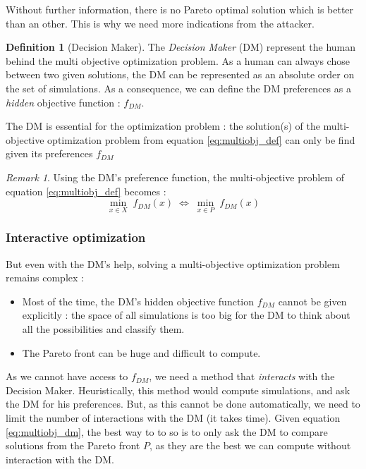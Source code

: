 \documentclass{article}
\theoremstyle{definition}
\newtheorem{definition}{Definition}[section]
\theoremstyle{remark}
\newtheorem{remark}{Remark}
\begin{document}
			Without further information, there is no Pareto optimal solution which is better than an other. This is why we need more indications from the attacker. 

			\begin{definition}[Decision Maker]
				The \emph{Decision Maker} (DM) represent the human behind the multi objective optimization problem. As a human can always chose between two given solutions, the DM can be represented as an absolute order on the set of simulations.
				As a consequence, we can define the DM preferences as a \emph{hidden} objective function : $f_{DM}$.
			\end{definition}

			The DM is essential for the optimization problem : the solution(s) of the multi-objective optimization problem from equation \ref{eq:multiobj_def} can only be find given its preferences $f_{DM}$

			\begin{remark}
				Using the DM's preference function, the multi-objective problem of equation \ref{eq:multiobj_def} becomes :
				\begin{equation}\label{eq:multiobj_dm}
						\min_{x\in X}  \; f_{DM}(x) \; \Longleftrightarrow \;\min_{x\in P} \;f_{DM}(x)
				\end{equation}
			\end{remark}
			
		\subsubsection{Interactive optimization}
			But even with the DM's help, solving a multi-objective optimization problem remains complex : 
			\begin{itemize}
			\item Most of the time, the DM's hidden objective function $f_{DM}$ cannot be given explicitly : the space of all simulations is too big for the DM to think about all the possibilities and classify them.
			\item The Pareto front can be huge and difficult to compute.
			\end{itemize}
			As we cannot have access to $f_{DM}$, we need a method that \emph{interacts} with the Decision Maker. Heuristically, this method would compute simulations, and ask the DM for his preferences. But, as this cannot be done automatically, we need to limit the number of interactions with the DM (it takes time). Given equation \ref{eq:multiobj_dm}, the best way to to so is to only ask the DM to compare solutions from the Pareto front $P$, as they are the best we can compute without interaction with the DM.
\end{document}
